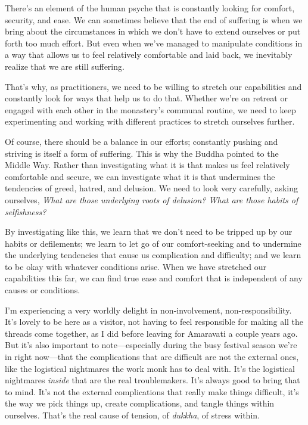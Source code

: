 
There's an element of the human psyche that is constantly looking for 
comfort, security, and ease. We can sometimes believe that the end of 
suffering is when we bring about the circumstances in which we don't 
have to extend ourselves or put forth too much effort. But even when 
we've managed to manipulate conditions in a way that allows us to feel 
relatively comfortable and laid back, we inevitably realize that we are 
still suffering.

That's why, as practitioners, we need to be willing to stretch our 
capabilities and constantly look for ways that help us to do that. 
Whether we're on retreat or engaged with each other in the monastery's 
communal routine, we need to keep experimenting and working with 
different practices to stretch ourselves further.

Of course, there should be a balance in our efforts; constantly pushing 
and striving is itself a form of suffering. This is why the Buddha 
pointed to the Middle Way. Rather than investigating what it is that 
makes us feel relatively comfortable and secure, we can investigate 
what it is that undermines the tendencies of greed, hatred, and 
delusion. We need to look very carefully, asking ourselves, \emph{What 
are those underlying roots of delusion? What are those habits of 
selfishness?}

By investigating like this, we learn that we don't need to be tripped 
up by our habits or defilements; we learn to let go of our 
comfort-seeking and to undermine the underlying tendencies that cause 
us complication and difficulty; and we learn to be okay with whatever 
conditions arise. When we have stretched our capabilities this far, we 
can find true ease and comfort that is independent of any causes or 
conditions.


I'm experiencing a very worldly delight in non-involvement, 
non-responsibility. It's lovely to be here as a visitor, not having to 
feel responsible for making all the threads come together, as I did 
before leaving for Amaravati a couple years ago. But it's also 
important to note---especially during the busy festival season we're in 
right now---that the complications that are difficult are not the 
external ones, like the logistical nightmares the work monk has to deal 
with. It's the logistical nightmares \emph{inside} that are the real 
troublemakers. It's always good to bring that to mind. It's not the 
external complications that really make things difficult, it's the way 
we pick things up, create complications, and tangle things within 
ourselves. That's the real cause of tension, of \emph{dukkha}, of 
stress within.

